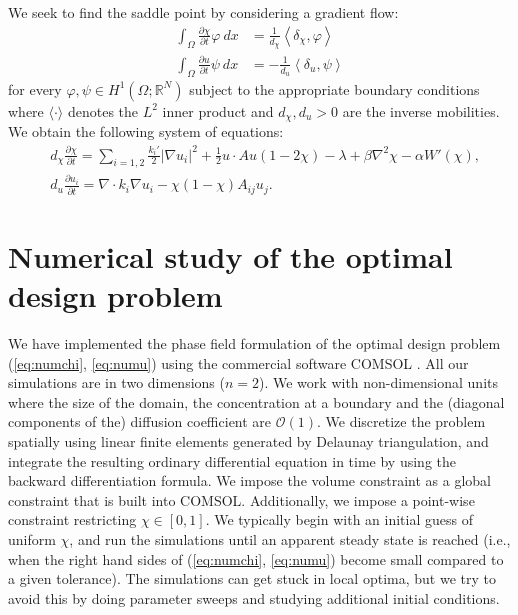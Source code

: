 \documentclass[11pt]{article}
\begin{document}
We seek to find the saddle point by considering a gradient flow:
\begin{align*}
\int_\Omega \frac{\partial \chi}{\partial t}\varphi \ dx 
&= \frac{1}{d_\chi} \left\langle \delta_\chi, \varphi \right\rangle \\
\int_\Omega \frac{\partial u}{\partial t}\psi \ dx 
&= - \frac{1}{d_u} \left\langle \delta_u, \psi \right\rangle
\end{align*}
for every $\varphi, \psi \in H^1(\Omega;\mathbb{R}^N)$ subject to the appropriate boundary conditions where $\langle \cdot \rangle$ denotes the $L^2$ inner product and $d_\chi,d_u > 0$ are the inverse mobilities.
We obtain the following system of equations:
\begin{align}
&d_\chi \frac{\partial \chi}{\partial t}=\sum_{i=1,2}\frac{k_i'}{2}|\nabla u_i|^2+\frac{1}{2}u\cdot Au(1-2\chi)-\lambda  + \beta\nabla^2\chi-\alpha W'(\chi), \label{eq:numchi}\\
&d_u\frac{\partial u_i}{\partial t}=\nabla\cdot k_i \nabla u_i-\chi(1-\chi) A_{ij} u_j . \label{eq:numu}
\end{align}

\section{Numerical study of the optimal design problem}

We have implemented the phase field formulation of the optimal design problem (\ref{eq:numchi}, \ref{eq:numu}) using the commercial software COMSOL \cite{comsol}. All our simulations are in two dimensions ($n=2$).  We work with non-dimensional units where the size of the domain, the concentration at a boundary and the (diagonal components of the) diffusion coefficient are $\mathcal{O}(1)$. We discretize the problem spatially using linear finite elements generated by Delaunay triangulation, and integrate the resulting ordinary differential equation in time by using the backward differentiation formula. We impose the volume constraint as a global constraint that is built into COMSOL.  Additionally, we impose a point-wise constraint restricting $\chi \in [0,1]$. We typically begin with an initial guess of uniform $\chi$, and run the simulations until an apparent steady state is reached (i.e., when the right hand sides of (\ref{eq:numchi}, \ref{eq:numu}) become small compared to a given tolerance). The simulations can get stuck in local optima, but we try to avoid this by doing parameter sweeps and studying additional initial conditions.
 
\end{document}
